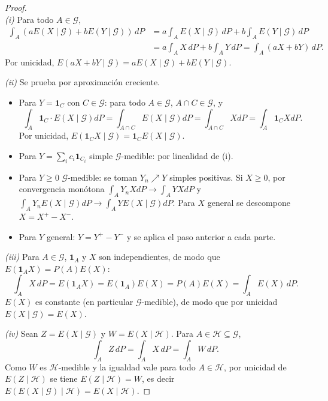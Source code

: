 \documentclass[11pt, a4paper]{article}
\begin{document}
\begin{proof}\leavevmode\\
\textit{(i)} Para todo $A \in \mathcal{G}$,
\begin{align*}
\int_A (aE(X \mid \mathcal{G}) + b E(Y \mid \mathcal{G})) \, dP
&= a \int_A E(X \mid \mathcal{G}) \, dP + b \int_A E(Y \mid \mathcal{G}) \, dP \\
&= a \int_A X \, dP + b \int_A Y \, dP = \int_A (aX + bY) \, dP.
\end{align*}
Por unicidad, $E(aX + bY \mid \mathcal{G}) = a E(X \mid \mathcal{G}) + b E(Y \mid \mathcal{G})$.

\textit{(ii)} Se prueba por aproximación creciente.
\begin{itemize}
    \item Para $Y = \mathbf{1}_C$ con $C \in \mathcal{G}$: para todo $A \in \mathcal{G}$,
    $A \cap C \in \mathcal{G}$, y
    $$ \int_A \mathbf{1}_C \cdot E(X \mid \mathcal{G}) dP = \int_{A \cap C} E(X \mid \mathcal{G}) dP
    = \int_{A \cap C} X dP = \int_A \mathbf{1}_C X dP. $$
    Por unicidad, $E(\mathbf{1}_C X \mid \mathcal{G}) = \mathbf{1}_C E(X \mid \mathcal{G})$.

    \item Para $Y = \sum_i c_i \mathbf{1}_{C_i}$ simple $\mathcal{G}$-medible: por linealidad de
    (i).

    \item Para $Y \ge 0$ $\mathcal{G}$-medible: se toman $Y_n \nearrow Y$ simples positivas. Si
    $X \ge 0$, por convergencia monótona $\int_A Y_n X dP \to \int_A YX dP$ y $\int_A Y_n
    E(X \mid \mathcal{G}) dP \to \int_A Y E(X \mid \mathcal{G}) dP$. Para $X$ general se descompone
    $X = X^+ - X^-$.

    \item Para $Y$ general: $Y = Y^+ - Y^-$ y se aplica el paso anterior a cada parte.
\end{itemize}

\textit{(iii)} Para $A \in \mathcal{G}$, $\mathbf{1}_A$ y $X$ son independientes,
de modo que $E(\mathbf{1}_A X) = P(A) E(X)$:
$$ \int_A X \, dP = E(\mathbf{1}_A X) = E(\mathbf{1}_A) E(X) = P(A) E(X) = \int_A E(X) \, dP. $$
$E(X)$ es constante (en particular $\mathcal{G}$-medible), de modo que por unicidad
$E(X \mid \mathcal{G}) = E(X)$.

\textit{(iv)} Sean $Z = E(X \mid \mathcal{G})$ y $W = E(X \mid \mathcal{H})$. Para
$A \in \mathcal{H} \subseteq \mathcal{G}$,
$$ \int_A Z \, dP = \int_A X \, dP = \int_A W \, dP. $$
Como $W$ es $\mathcal{H}$-medible y la igualdad vale para todo $A \in \mathcal{H}$, por unicidad de
$E(Z \mid \mathcal{H})$ se tiene $E(Z \mid \mathcal{H}) = W$, es decir $E(E(X \mid \mathcal{G})
\mid \mathcal{H}) = E(X \mid \mathcal{H})$.
\end{proof}
\end{document}
